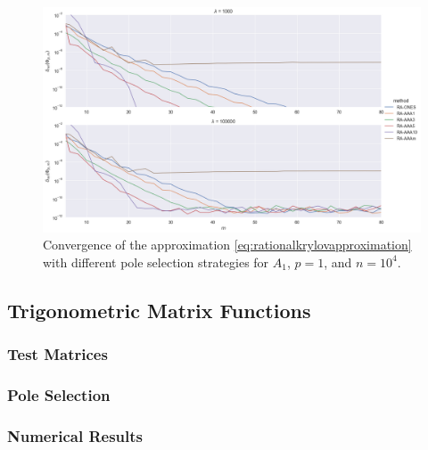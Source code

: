 \begin{figure}[h]
    \centering
    \includegraphics[width=.9\textwidth]{img/AAA/cnvg_poles_n1e04_eigs.png}
    \caption{
        Convergence of the approximation \eqref{eq:rationalkrylovapproximation} with different
        pole selection strategies for $A_1$, $p=1$, and $n=10^4$.
    }
    \label{fig:rationalkrylovpoleselection}
\end{figure}

\FloatBarrier
\subsection{Trigonometric Matrix Functions}
\subsubsection*{Test Matrices}
\subsubsection*{Pole Selection}
\subsubsection*{Numerical Results}

